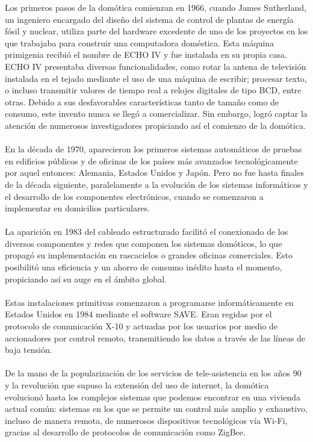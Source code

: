 Los primeros pasos de la domótica comienzan en 1966, cuando James Sutherland, un ingeniero encargado del diseño del sistema de control de plantas de energía fósil y nuclear, utiliza parte del hardware excedente de uno de los proyectos en los que trabajaba para construir una computadora doméstica. Esta máquina primigenia recibió el nombre de ECHO IV y fue instalada en su propia casa. ECHO IV presentaba diversas funcionalidades, como rotar la antena de televisión instalada en el tejado mediante el uso de una máquina de escribir; procesar texto, o incluso transmitir valores de tiempo real a relojes digitales de tipo BCD, entre otras. Debido a sus desfavorables características tanto de tamaño como de consumo, este invento nunca se llegó a comercializar. Sin embargo, logró captar la atención de numerosos investigadores propiciando así el comienzo de la domótica.\\\\
En la década de 1970, aparecieron los primeros sistemas automáticos de pruebas en edificios públicos y de oficinas de los países más avanzados tecnológicamente por aquel entonces: Alemania, Estados Unidos y Japón. Pero no fue hasta finales de la década siguiente, paralelamente a la evolución de los sistemas informáticos y el desarrollo de los componentes electrónicos, cuando se comenzaron a implementar en domicilios particulares. \\\\
La aparición en 1983 del cableado estructurado facilitó el conexionado de los diversos componentes y redes que componen los sistemas domóticos, lo que propagó su implementación en rascacielos o grandes oficinas comerciales. Esto posibilitó una eficiencia y un ahorro de consumo inédito hasta el momento, propiciando así su auge en el ámbito global. \\\\
Estas instalaciones primitivas comenzaron a programarse informáticamente en Estados Unidos en 1984 mediante el software SAVE. Eran regidas por el protocolo de comunicación X-10 y actuadas por los usuarios por medio de accionadores por control remoto, transmitiendo los datos a través de las líneas de baja tensión. \\\\
De la mano de la popularización de los servicios de tele-asistencia en los años 90 y la revolución que supuso la extensión del uso de internet, la domótica evolucionó hasta los complejos sistemas que podemos encontrar en una vivienda actual común: sistemas en los que se permite un control más amplio y exhaustivo, incluso de manera remota, de numerosos dispositivos tecnológicos vía Wi-Fi, gracias al desarrollo de protocolos de comunicación como ZigBee. \\\\
